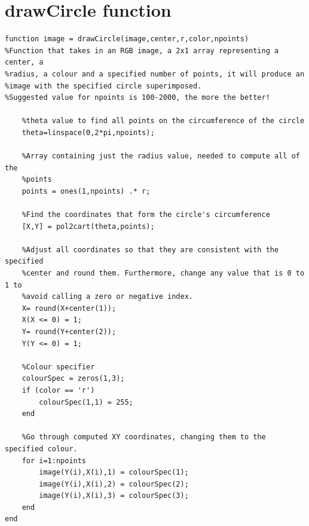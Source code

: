 \documentclass[10pt,a4paper,onecolumn]{report}
\begin{document}
\section{drawCircle function}
\begin{lstlisting}
function image = drawCircle(image,center,r,color,npoints)
%Function that takes in an RGB image, a 2x1 array representing a center, a
%radius, a colour and a specified number of points, it will produce an
%image with the specified circle superimposed.
%Suggested value for npoints is 100-2000, the more the better!

    %theta value to find all points on the circumference of the circle
    theta=linspace(0,2*pi,npoints);

    %Array containing just the radius value, needed to compute all of the 
    %points
    points = ones(1,npoints) .* r;

    %Find the coordinates that form the circle's circumference
    [X,Y] = pol2cart(theta,points);

    %Adjust all coordinates so that they are consistent with the specified
    %center and round them. Furthermore, change any value that is 0 to 1 to
    %avoid calling a zero or negative index.
    X= round(X+center(1));
    X(X <= 0) = 1;
    Y= round(Y+center(2));
    Y(Y <= 0) = 1;

    %Colour specifier
    colourSpec = zeros(1,3);
    if (color == 'r')
        colourSpec(1,1) = 255;
    end

    %Go through computed XY coordinates, changing them to the specified colour.
    for i=1:npoints
        image(Y(i),X(i),1) = colourSpec(1);
        image(Y(i),X(i),2) = colourSpec(2);
        image(Y(i),X(i),3) = colourSpec(3);
    end
end
\end{lstlisting}
\end{document}
